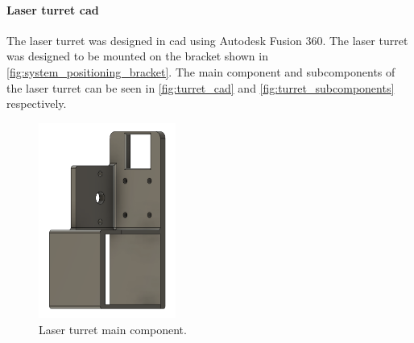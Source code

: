 \paragraph{Laser turret \gls{cad}}
The laser turret was designed in \gls{cad} using Autodesk Fusion 360. The laser turret was designed to be mounted on the bracket shown in \autoref{fig:system_positioning_bracket}. The main component and subcomponents of the laser turret can be seen in \autoref{fig:turret_cad} and \autoref{fig:turret_subcomponents} respectively.
\begin{figure}[!htb]
    \centering
    \includegraphics[width=0.4\textwidth]{figures/hardware_design/turret.png}
    \caption{Laser turret main component.}
    \label{fig:turret_cad}
\end{figure}
